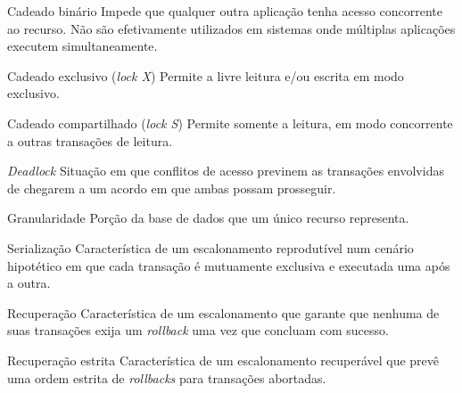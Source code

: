 \documentclass{beamer}
\begin{document}

\begin{frame}
    \begin{block}{Cadeado binário}
        Impede que qualquer outra aplicação tenha acesso concorrente ao recurso. Não são efetivamente utilizados em sistemas onde múltiplas aplicações executem simultaneamente.
    \end{block}
    \begin{block}{Cadeado exclusivo (\emph{lock X})}
        Permite a livre leitura e/ou escrita em modo exclusivo.
    \end{block}
    \begin{block}{Cadeado compartilhado (\emph{lock S})}
        Permite somente a leitura, em modo concorrente a outras transações de leitura.
    \end{block}
    \begin{block}{\emph{Deadlock}}
        Situação em que conflitos de acesso previnem as transações envolvidas de chegarem a um acordo em que ambas possam prosseguir.
    \end{block}
\end{frame}


\begin{frame}
    \begin{block}{Granularidade}
        Porção da base de dados que um único recurso representa.
    \end{block}
    \begin{block}{Serialização}
        Característica de um escalonamento reprodutível num cenário hipotético em que cada transação é mutuamente exclusiva e executada uma após a outra.
    \end{block}
    \begin{block}{Recuperação}
        Característica de um escalonamento que garante que nenhuma de suas transações exija um \emph{rollback} uma vez que concluam com sucesso.
       \end{block}
    \begin{block}{Recuperação estrita}
        Característica de um escalonamento recuperável que prevê uma ordem estrita de \emph{rollbacks} para transações abortadas.
    \end{block}
\end{frame}
\end{document}
